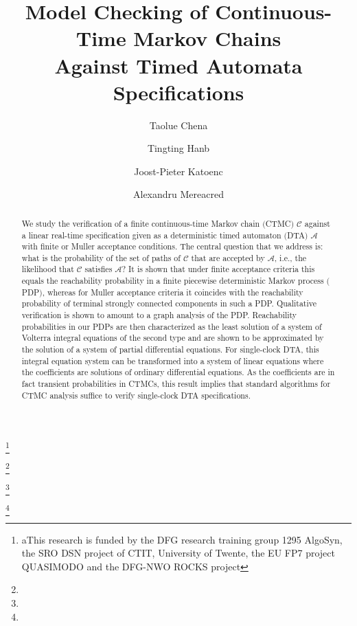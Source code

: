 \documentclass{LMCS}
\newcommand{\mc}[1]{\mathcal{#1}}
\newcommand{\<}{\langle}
\renewcommand{\>}{\rangle}
\newcommand{\mC}{\mathcal{C}}
\newcommand{\mA}{\mathcal{A}}
\newcommand{\CTMC}{\textsc{{CTMC}}}
\newcommand{\DTA}{\textsc{DTA}}
\newcommand{\PDP}{\textsc{PDP}}
\begin{document}
\title[Model Checking of CTMCs Against Timed Automata]{Model Checking of Continuous-Time Markov Chains \\
Against Timed Automata Specifications}

\author[T.~Chen]{Taolue Chen\rsuper a} \address{{\lsuper a}Formal Methods and Tools,
University of Twente, The Netherlands}    \thanks{{\lsuper a}This research is funded by the DFG
research training group 1295 AlgoSyn, the SRO DSN project of CTIT, University of Twente, the EU FP7 project QUASIMODO
and the DFG-NWO ROCKS project}  

\author[T.~Han]{Tingting Han\rsuper b} \address{{}Software Modelling and
Verification, RWTH Aachen University, Germany
}    \thanks{}   

\author[J.-P.~Katoen]{Joost-Pieter Katoen\rsuper c}  \address{{\lsuper c}Software Modelling and
Verification, RWTH Aachen University, Germany;\newline Formal Methods and Tools, University of Twente, The Netherlands}      \thanks{}   

\author[A.~Mereacre]{Alexandru Mereacre\rsuper d}   \address{ pt}  \thanks{}


\begin{abstract}
\noindent
We study the verification of a finite continuous-time Markov chain $($\CTMC$)$
$\mc{C}$ against a linear real-time specification given as a deterministic
timed automaton $($\DTA$)$ $\mc{A}$ with finite or Muller acceptance
conditions.
The central question that we address is: what is the probability of the set of
paths of $\mc{C}$ that are accepted by $\mc{A}$, i.e., the likelihood that
$\mC$ satisfies $\mA$?
It is shown that under finite acceptance criteria this equals the reachability
probability in a finite piecewise deterministic Markov process $($\PDP$)$, whereas
for Muller acceptance criteria it coincides with the reachability probability
of terminal strongly connected components in such a PDP.
Qualitative verification is shown to amount to a graph analysis of the PDP.
Reachability probabilities in our PDPs are then characterized as the least solution
of a system of Volterra integral equations of the second type and are shown
to be approximated by the solution of a system of partial differential equations.
For single-clock \DTA, this integral equation system can be transformed into
a system of linear equations where the coefficients are solutions of ordinary
differential equations.
As the coefficients are in fact transient probabilities in CTMCs, this result implies that
standard algorithms for CTMC analysis suffice to verify single-clock DTA specifications.
\end{abstract}
\end{document}
